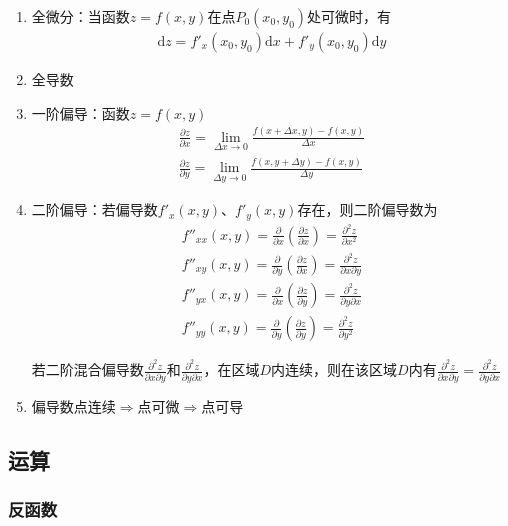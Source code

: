 \documentclass[12pt]{book}
\begin{document}
\begin{enumerate}[1.]
    \item 全微分：当函数$z=f(x,y) $在点$ P_0(x_0,y_0) $处可微时，有
    \begin{gather*}
        \mathrm{d}z=f'_x(x_0,y_0)\mathrm{d}x+f'_y(x_0,y_0)\mathrm{d}y
    \end{gather*}
    \item 全导数
    \item 一阶偏导：函数$ z=f(x,y) $
    \begin{gather*}
        \frac{\partial z}{\partial x} = \lim_{\Delta x\rightarrow 0}{\frac{f(x+\Delta x,y)-f(x,y)}{\Delta x}}\\ 
        \frac{\partial z}{\partial y} = \lim_{\Delta y\rightarrow 0}{\frac{f(x,y+\Delta y)-f(x,y)}{\Delta y}} 
    \end{gather*} 
    \item 二阶偏导：若偏导数$ f'_x(x,y) $、$ f'_y(x,y) $存在，则二阶偏导数为
    \begin{gather*}
        f''_{xx}(x,y)=\frac{\partial}{\partial x}(\frac{\partial z}{\partial x}) = \frac{\partial^2 z}{\partial{x}^2}\\ 
        f''_{xy}(x,y)=\frac{\partial}{\partial y}(\frac{\partial z}{\partial x}) = \frac{\partial^2 z}{\partial{x}\partial{y}}\\ 
        f''_{yx}(x,y)=\frac{\partial}{\partial x}(\frac{\partial z}{\partial y}) = \frac{\partial^2 z}{\partial{y}\partial{x}}\\ 
        f''_{yy}(x,y)=\frac{\partial}{\partial y}(\frac{\partial z}{\partial y}) = \frac{\partial^2 z}{\partial{y}^2} 
    \end{gather*}
    \par 若二阶混合偏导数$ \frac{\partial^2 z}{\partial{x}\partial{y}} $和$ \frac{\partial^2 z}{\partial{y}\partial{x}} $，在区域$ D $内连续，则在该区域$ D $内有$ \frac{\partial^2 z}{\partial{x}\partial{y}}=\frac{\partial^2 z}{\partial{y}\partial{x}} $
    \item 偏导数点连续$\Rightarrow$点可微$\Rightarrow$点可导
\end{enumerate}







\subsection{运算}

\subsubsection{反函数}
\end{document}
